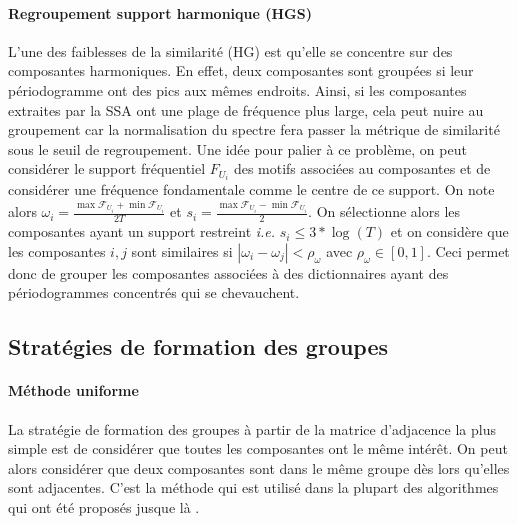 \documentclass{gretsi}
\newcommand{\inter}{\left[0, 1\right]}
\begin{document}
\paragraph{Regroupement support harmonique (HGS)}\label{par:HGS}
    L'une des faiblesses de la similarité (HG) est qu'elle se concentre sur des composantes harmoniques. En effet, deux composantes sont groupées si leur périodogramme ont des pics aux mêmes endroits. Ainsi, si les composantes extraites par la SSA ont une plage de fréquence plus large, cela peut nuire au groupement car la normalisation du spectre fera passer la métrique de similarité sous le seuil de regroupement.
    Une idée pour palier à ce problème, on peut considérer le support fréquentiel $F_{U_i}$ des motifs associées au composantes et de considérer une fréquence fondamentale comme le centre de ce support. On note alors $\omega_i = \frac{\displaystyle\max \mathcal F_{U_i} + \min \mathcal F_{U_i} }{2 T}$ et $s_i = \frac{\displaystyle\max \mathcal F_{U_i} - \min \mathcal F_{U_i} }{2}$. On sélectionne alors les composantes ayant un support restreint \emph{i.e.} $s_i \le 3*\log(T)$ et on considère que les composantes $i, j$ sont similaires si $|\omega_i - \omega_j| < \rho_\omega$ avec $\rho_\omega \in \inter$.
    Ceci permet donc de grouper les composantes associées à des dictionnaires ayant des périodogrammes concentrés qui se chevauchent.



\subsection{Stratégies de formation des groupes}
\label{sub:clust}
\paragraph{Méthode uniforme}
La stratégie de formation des groupes à partir de la matrice d'adjacence la plus simple est de considérer que toutes les composantes ont le même intérêt. On peut alors considérer que deux composantes sont dans le même groupe dès lors qu'elles sont adjacentes. C'est la méthode qui est utilisé dans la plupart des algorithmes qui ont été proposés jusque là \cite{abalov_14_auto, alvarez_13_auto}.\\

\end{document}
